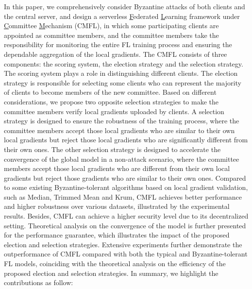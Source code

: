 \documentclass[10pt,journal,compsoc]{IEEEtran}
\begin{document}
In this paper, we comprehensively consider Byzantine attacks of both clients and the central server, and design a serverless \underline{F}ederated \underline{L}earning framework under \underline{C}ommittee \underline{M}echanism (CMFL), in which some participating clients are appointed as committee members, and the committee members take the responsibility for monitoring the entire FL training process and ensuring the dependable aggregation of the local gradients. The CMFL consists of three components: the scoring system, the election strategy and the selection strategy. The scoring system plays a role in distinguishing different clients. The election strategy is responsible for selecting some clients who can represent the majority of clients to become members of the new committee. Based on different considerations, we propose two opposite selection strategies to make the committee members verify local gradients uploaded by clients. A selection strategy is designed to ensure the robustness of the training process, where the committee members accept those local gradients who are similar to their own local gradients but reject those local gradients who are significantly different from their own ones. The other selection strategy is designed to accelerate the convergence of the global model in a non-attack scenario, where the committee members accept those local gradients who are different from their own local gradients but reject those gradients who are similar to their own ones. {Compared to some existing Byzantine-tolerant algorithms based on local gradient validation, such as Median\cite{pmlr-v80-yin18a}, Trimmed Mean\cite{pmlr-v80-yin18a} and Krum\cite{Blanchard2017Byzantine}, CMFL achieves better performance and higher robustness over various datasets, illustrated by the experimental results. Besides, CMFL can achieve a higher security level due to its decentralized setting.} Theoretical analysis on the convergence of the model is further presented for the performance guarantee, which illustrates the impact of the proposed election and selection strategies. Extensive experiments further demonstrate the outperformance of CMFL compared with both the typical and Byzantine-tolerant FL models, coinciding with the theoretical analysis on the efficiency of the proposed election and selection strategies. In summary, we highlight the contributions as follow:
\end{document}
